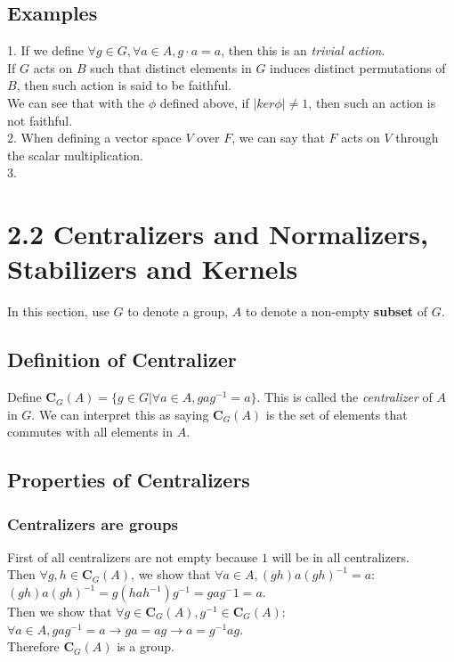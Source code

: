 \documentclass{article}
\begin{document}
\subsection{Examples}
\begin{addmargin}[1em]{0em}
1. If we define $\forall g\in G, \forall a \in A, g\cdot a = a$, then this is an \textit{trivial action}.\\
If $G$ acts on $B$ such that distinct elements in $G$ induces distinct permutations of $B$, then such action is said to be faithful.\\
We can see that with the $\phi$ defined above, if $|ker\phi| \neq 1$, then such an action is not faithful.\\
2. When defining a vector space $V$ over $F$, we can say that $F$ acts on $V$ through the scalar multiplication.\\
3. 
\end{addmargin}
\section{2.2 Centralizers and Normalizers, Stabilizers and Kernels}
In this section, use $G$ to denote a group, $A$ to denote a non-empty \textbf{subset} of $G$.\\
\subsection{Definition of Centralizer}
\begin{addmargin}[1em]{0em}
Define $\textbf{C}_G(A)=\{g\in G|\forall a\in A, gag^{-1}=a\}$. This is called the \textit{centralizer} of $A$ in $G$. We can interpret this as saying $\textbf{C}_G(A)$ is the set of elements that commutes with all elements in $A$.
\end{addmargin}
\subsection{Properties of Centralizers}
\subsubsection{Centralizers are groups}
\begin{addmargin}[1em]{0em}
First of all centralizers are not empty because $1$ will be in all centralizers.\\
Then $\forall g, h \in \textbf{C}_G(A)$, we show that $\forall a \in A, (gh)a(gh)^{-1} = a$:\\
$(gh)a(gh)^{-1} = g(hah^{-1})g^{-1} = gag^-1 = a$.\\
Then we show that $\forall g \in \textbf{C}_G(A), g^{-1} \in \textbf{C}_G(A)$:
$\forall a \in A, gag^{-1} = a \rightarrow ga = ag \rightarrow a = g^{-1}ag$.\\
Therefore $\textbf{C}_G(A)$ is a group.
\end{addmargin}
\end{document}
